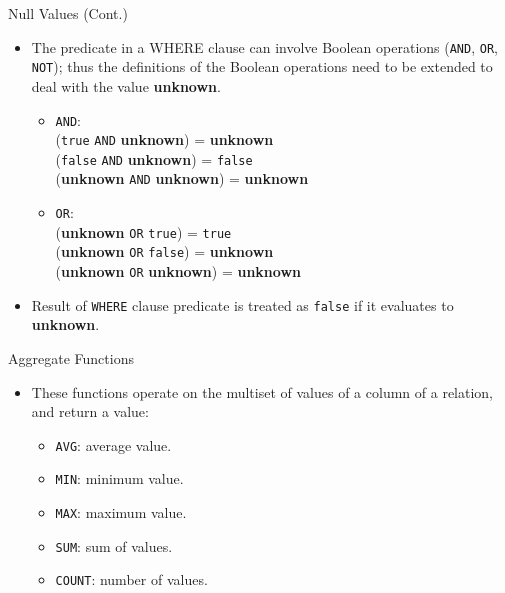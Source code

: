 \documentclass{beamer}
\begin{document}
\begin{frame}[fragile]{Null Values (Cont.)}
    \begin{itemize}
        \item The predicate in a WHERE clause can involve Boolean operations (\texttt{AND}, \texttt{OR}, \texttt{NOT}); thus the definitions of the Boolean operations need to be extended to deal with the value \textbf{unknown}.
        \begin{itemize}
            \item \texttt{AND}:\\ 
                (\texttt{true} \texttt{AND} \textbf{unknown}) = \textbf{unknown}\\
                (\texttt{false} \texttt{AND} \textbf{unknown}) = \texttt{false}\\
                (\textbf{unknown} \texttt{AND} \textbf{unknown}) = \textbf{unknown}\\
            \item \texttt{OR}:\\ 
                (\textbf{unknown} \texttt{OR} \texttt{true}) = \texttt{true}\\
                (\textbf{unknown} \texttt{OR} \texttt{false}) = \textbf{unknown}\\
                (\textbf{unknown} \texttt{OR} \textbf{unknown}) = \textbf{unknown}\\
        \end{itemize}
        \item Result of \texttt{WHERE} clause predicate is treated as \texttt{false} if it evaluates to \textbf{unknown}.
    \end{itemize}
\end{frame}

\begin{frame}[fragile]{Aggregate Functions}
    \begin{itemize}
        \item These functions operate on the multiset of values of a column of a relation, and return a value:
        \begin{itemize}
            \item \texttt{AVG}: average value.
            \item \texttt{MIN}: minimum value.
            \item \texttt{MAX}: maximum value.
            \item \texttt{SUM}: sum of values.
            \item \texttt{COUNT}: number of values.
        \end{itemize}
    \end{itemize}
\end{frame}
\end{document}
